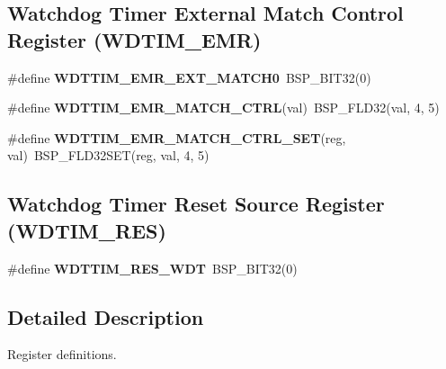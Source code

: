 \subsection*{Watchdog Timer External Match Control Register (W\+D\+T\+I\+M\+\_\+\+E\+MR)}
\begin{DoxyCompactItemize}
\item 
\mbox{\label{group__lpc32xx__reg_ga858ed13f75ab2242fff05468690977aa}} 
\#define {\bfseries W\+D\+T\+T\+I\+M\+\_\+\+E\+M\+R\+\_\+\+E\+X\+T\+\_\+\+M\+A\+T\+C\+H0}~B\+S\+P\+\_\+\+B\+I\+T32(0)
\item 
\mbox{\label{group__lpc32xx__reg_gacc00852cbfee4847564aa50af344567e}} 
\#define {\bfseries W\+D\+T\+T\+I\+M\+\_\+\+E\+M\+R\+\_\+\+M\+A\+T\+C\+H\+\_\+\+C\+T\+RL}(val)~B\+S\+P\+\_\+\+F\+L\+D32(val, 4, 5)
\item 
\mbox{\label{group__lpc32xx__reg_ga60f58e53954d63a1a3cfaeab9442700f}} 
\#define {\bfseries W\+D\+T\+T\+I\+M\+\_\+\+E\+M\+R\+\_\+\+M\+A\+T\+C\+H\+\_\+\+C\+T\+R\+L\+\_\+\+S\+ET}(reg,  val)~B\+S\+P\+\_\+\+F\+L\+D32\+S\+ET(reg, val, 4, 5)
\end{DoxyCompactItemize}
\subsection*{Watchdog Timer Reset Source Register (W\+D\+T\+I\+M\+\_\+\+R\+ES)}
\begin{DoxyCompactItemize}
\item 
\mbox{\label{group__lpc32xx__reg_ga8d064b175ce39fd18dbedf7d980713f0}} 
\#define {\bfseries W\+D\+T\+T\+I\+M\+\_\+\+R\+E\+S\+\_\+\+W\+DT}~B\+S\+P\+\_\+\+B\+I\+T32(0)
\end{DoxyCompactItemize}


\subsection{Detailed Description}
Register definitions. 

